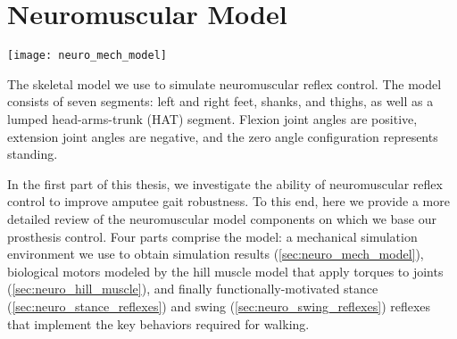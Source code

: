 \chapter{Neuromuscular Model}\label{sec:neuro_model}

\graphicspath{{chapters/neuromuscular_model/figures/}}

\begin{marginfigure}
    \centering
    \texttt{[image: neuro\_mech\_model]}
    \caption[The skeletal model we use to simulate neuromuscular reflex
    control]{The skeletal model we use to simulate neuromuscular reflex control.
    The model consists of seven segments: left and right feet, shanks, and
    thighs, as well as a lumped head-arms-trunk (HAT) segment. Flexion joint
    angles are positive, extension joint angles are negative, and the zero angle
    configuration represents standing.}\label{fig:neuro_seven_link}
\end{marginfigure}

In the first part of this thesis, we investigate the ability of neuromuscular
reflex control to improve amputee gait robustness. To this end, here we provide
a more detailed review of the neuromuscular model components on which we base
our prosthesis control. Four parts comprise the model: a mechanical simulation
environment we use to obtain simulation results (\cref{sec:neuro_mech_model}),
biological motors modeled by the hill muscle model that apply torques to joints
(\cref{sec:neuro_hill_muscle}), and finally functionally-motivated stance
(\cref{sec:neuro_stance_reflexes}) and swing (\cref{sec:neuro_swing_reflexes})
reflexes that implement the key behaviors required for walking.





